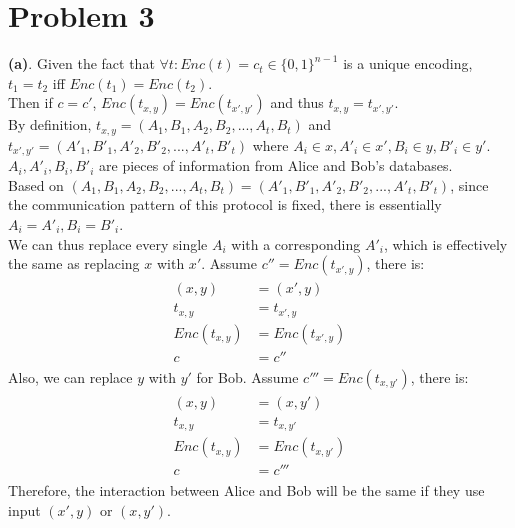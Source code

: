 \documentclass[titlepage, paper=a4, fontsize=11pt]{scrartcl} %
\numberwithin{equation}{section} %
\numberwithin{figure}{section} %
\numberwithin{table}{section} %
\begin{document}

\section*{Problem 3}
\textbf{(a)}. Given the fact that $\forall t: Enc(t)=c_t \in \{0,1\}^{n-1}$ is a unique encoding,
$t_1 = t_2$ iff $Enc(t_1)=Enc(t_2)$. \\

Then if $c=c'$, $Enc(t_{x,y})=Enc(t_{x',y'})$ and thus $t_{x,y}=t_{x',y'}$. \\
By definition, $t_{x,y}=(A_1, B_1, A_2, B_2, ..., A_t, B_t)$ and
$t_{x',y'}=(A'_1, B'_1, A'_2, B'_2, ..., A'_t, B'_t)$ where $A_i \in x, A'_i \in x', B_i \in y, B'_i \in y'$.
$A_i, A'_i, B_i, B'_i$ are pieces of information from Alice and Bob's databases. \\

Based on $(A_1, B_1, A_2, B_2, ..., A_t, B_t) = (A'_1, B'_1, A'_2, B'_2, ..., A'_t, B'_t)$,
since the communication pattern of this protocol is fixed, there is essentially $A_i = A'_i, B_i = B'_i$. \\

We can thus replace every single $A_i$ with a corresponding $A'_i$, which is effectively the same as replacing $x$ with $x'$. Assume $c'' = Enc(t_{x',y})$, there is:
\begin{align*} 
\begin{split}
(x,y) &= (x',y) \\
t_{x,y} &= t_{x',y} \\
Enc(t_{x,y}) &= Enc(t_{x',y}) \\
c &= c''
\end{split}					
\end{align*}
Also, we can replace $y$ with $y'$ for Bob. Assume $c''' = Enc(t_{x,y'})$, there is:
\begin{align*} 
\begin{split}
(x,y) &= (x,y') \\
t_{x,y} &= t_{x,y'} \\
Enc(t_{x,y}) &= Enc(t_{x,y'}) \\
c &= c'''
\end{split}					
\end{align*}
Therefore, the interaction between Alice and Bob will be the same if they use input $(x',y)$ or $(x,y')$. \\
\end{document}
